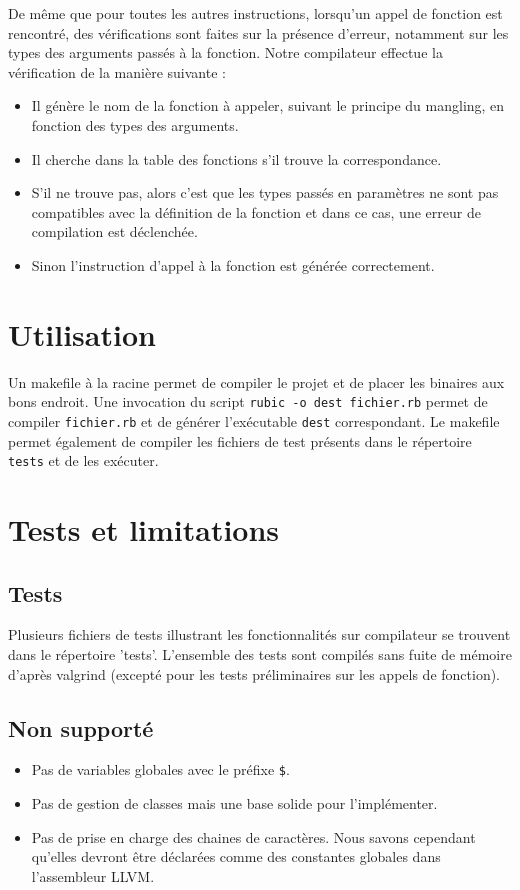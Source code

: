 \documentclass[12pt]{article}
\begin{document}
De même que pour toutes les autres instructions, lorsqu'un appel de fonction est rencontré, des vérifications sont faites sur la présence d'erreur, notamment sur les types des arguments passés à la fonction. Notre compilateur effectue la vérification de la manière suivante : 
\begin{itemize}
	\item Il génère le nom de la fonction à appeler, suivant le principe du mangling, en fonction des types des arguments.
	\item Il cherche dans la table des fonctions s'il trouve la correspondance.
	\item S'il ne trouve pas, alors c'est que les types passés en paramètres ne sont pas compatibles avec la définition de la fonction et dans ce cas, une erreur de compilation est déclenchée.
	\item Sinon l'instruction d'appel à la fonction est générée correctement.
\end{itemize}


\section{Utilisation}

Un makefile à la racine permet de compiler le projet et de placer les binaires
aux bons endroit. Une invocation du script \verb!rubic -o dest fichier.rb!
permet de compiler \verb!fichier.rb! et de générer l'exécutable \verb!dest!
correspondant. Le makefile permet également de compiler les fichiers de test
présents dans le répertoire \verb!tests! et de les exécuter.


\section{Tests et limitations}

\subsection{Tests}

Plusieurs fichiers de tests illustrant les fonctionnalités sur compilateur se trouvent dans le répertoire 'tests'. L'ensemble des tests sont compilés sans fuite de mémoire d'après valgrind (excepté pour les tests préliminaires sur les appels de fonction).

\subsection{Non supporté}
\begin{itemize}
	\item Pas de variables globales avec le préfixe \verb!$!.
	\item Pas de gestion de classes mais une base solide pour l'implémenter.
	\item Pas de prise en charge des chaines de caractères. Nous savons cependant qu'elles devront être déclarées comme des constantes globales dans l'assembleur LLVM.
\end{itemize}
\end{document}
